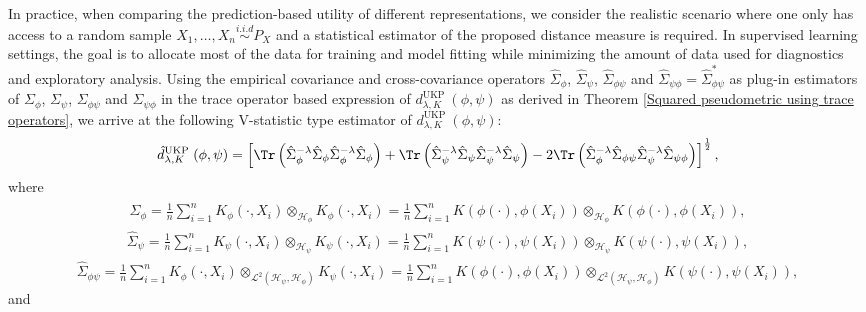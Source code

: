 \documentclass{article} %
\newcommand{\HS}{\mathcal{L}^{2}}
\newcommand{\repone}{\phi}
\newcommand{\reptwo}{\psi}
\newcommand{\Hone}{\mathcal{H}_{\phi}}
\newcommand{\Htwo}{\mathcal{H}_{\psi}}
\newcommand{\metricstname}{UKP }
\theoremstyle{plain}
\begin{document}
In practice, when comparing the prediction-based utility of different representations, we consider the realistic scenario where one only has access to a random sample $X_{1},\dots, X_{n} \overset{i.i.d}{\sim}P_{X}$ and a statistical estimator of the proposed distance measure is required. In supervised learning settings, the goal is to allocate most of the data for training and model fitting while minimizing the amount of data used for diagnostics and exploratory analysis. Using the empirical covariance and cross-covariance operators $\hat{\Sigma}_{\repone}$, $\hat{\Sigma}_{\reptwo}$, $\hat{\Sigma}_{\repone\reptwo}$ and $\hat{\Sigma}_{\reptwo\repone} = \hat{\Sigma}_{\repone\reptwo}^{*}$ as plug-in estimators of $\Sigma_{\repone}$, $\Sigma_{\reptwo}$, $\Sigma_{\repone\reptwo}$ and $\Sigma_{\reptwo\repone}$ in the trace operator based expression of $d_{\lambda,K}^{\text{\metricstname}}(\repone,\reptwo)$ as derived in Theorem \ref{Squared pseudometric using trace operators}, we arrive at the following V-statistic type estimator of $d_{\lambda,K}^{\text{\metricstname}}(\repone,\reptwo)$:
\begin{equation}\label{Pseudometric V-statistic estimator}
    \begin{aligned}
        \hat{d}_{\lambda,K}^{\text{\metricstname}}(\repone,\reptwo)
        = \left[\Tr\left(\hat{\Sigma}_{\repone}^{-\lambda}\hat{\Sigma}_{\repone}\hat{\Sigma}_{\repone}^{-\lambda}\hat{\Sigma}_{\repone}\right) + \Tr\left(\hat{\Sigma}_{\reptwo}^{-\lambda}\hat{\Sigma}_{\reptwo}\hat{\Sigma}_{\reptwo}^{-\lambda}\hat{\Sigma}_{\reptwo}\right)-2\Tr\left(\hat{\Sigma}_{\repone}^{-\lambda}\hat{\Sigma}_{\repone\reptwo}\hat{\Sigma}_{\reptwo}^{-\lambda}\hat{\Sigma}_{\reptwo\repone}\right)\right]^{\frac{1}{2}},
    \end{aligned}
\end{equation}
where
\[
\begin{aligned}
    \hat{\Sigma}_{\repone}=\frac{1}{n}\sum_{i=1}^{n}K_{\repone}(\cdot,X_{i}) \otimes_{\Hone}  K_{\repone}(\cdot,X_{i})
    =\frac{1}{n}\sum_{i=1}^{n}K(\repone(\cdot),\repone(X_{i})) \otimes_{\Hone} K(\repone(\cdot),\repone(X_{i})),
\end{aligned}
\]
\[
\begin{aligned}
    \hat{\Sigma}_{\reptwo}=\frac{1}{n}\sum_{i=1}^{n}K_{\reptwo}(\cdot,X_{i}) \otimes_{\Htwo}  K_{\reptwo}(\cdot,X_{i})
    =\frac{1}{n}\sum_{i=1}^{n}K(\reptwo(\cdot),\reptwo(X_{i})) \otimes_{\Htwo} K(\reptwo(\cdot),\reptwo(X_{i})),
\end{aligned}\]
\[
\begin{aligned}
    \hat{\Sigma}_{\repone\reptwo}=\frac{1}{n}\sum_{i=1}^{n}K_{\repone}(\cdot,X_{i}) \otimes_{\HS(\Htwo,\Hone)} K_{\reptwo}(\cdot,X_{i})
    =\frac{1}{n}\sum_{i=1}^{n}K(\repone(\cdot),\repone(X_{i})) \otimes_{\HS(\Htwo,\Hone)} K(\reptwo(\cdot),\reptwo(X_{i})),
\end{aligned}\] and 
\end{document}
